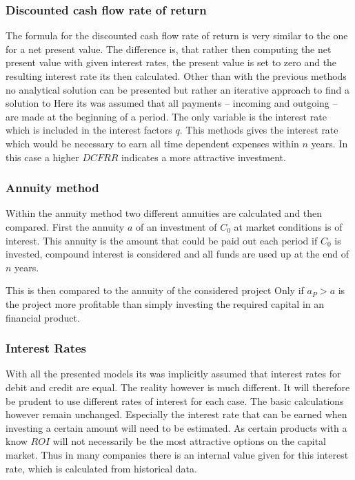 \subsubsection{Discounted cash flow rate of return}
The formula for the discounted cash flow rate of return is very similar to the one for a net present value.
The difference is, that rather then computing the net present value with given interest rates, the present
value is set to zero and the resulting interest rate its then calculated. Other than with the previous methods
no analytical solution can be presented but rather an iterative approach to find a solution to
%
Here its was assumed that all payments -- incoming and outgoing -- are made at the beginning of a period.
The only variable is the interest rate which is included in the interest factors $q$. This methods gives
the interest rate which would be necessary to earn all time dependent expenses within $n$ years. In this
case a higher $DCFRR$ indicates a more attractive investment.

\subsubsection{Annuity method}
Within the annuity method two different annuities are calculated and then compared. First the annuity $a$
of an investment of $C_0$ at market conditions is of interest.
%
This annuity is the amount that could be paid out each period if $C_0$ is invested, compound interest
is considered and all funds are used up at the end of $n$ years.

This is then compared to the annuity of the considered project
%
Only if $a_P > a$ is the project more profitable than simply investing the required capital in an
financial product.

\subsubsection{Interest Rates}
With all the presented models its was implicitly assumed that interest rates for debit and credit are
equal. The reality however is much different. It will therefore be prudent to use different rates of interest
for each case. The basic calculations however remain unchanged. Especially the interest rate that can be
earned when investing a certain amount will need to be estimated. As certain products with a know $ROI$
will not necessarily be the most attractive options on the capital market. Thus in many companies
there is an internal value given for this interest rate, which is calculated from historical data.





